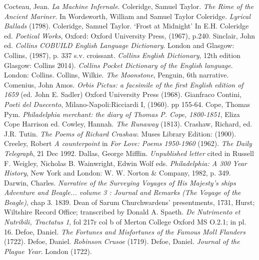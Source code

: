 \begin{bibitemlist}{1}
 Cocteau, Jean. \textit{La Machine Infernale}.
 Coleridge, Samuel Taylor. \textit{The Rime of the Ancient Mariner}. In Wordsworth, William and Samuel Taylor Coleridge. \textit{Lyrical Ballads} (1798).
 Coleridge, Samuel Taylor. ‘Frost at Midnight’ In E.H. Coleridge ed. \textit{Poetical Works}, Oxford: Oxford University Press, (1967), p.240.
 Sinclair, John ed. \textit{Collins COBUILD English Language Dictionary}. London and Glasgow: Collins, (1987), p. 337 s.v. croissant.
 \textit{Collins English Dictionary}, 12th edition Glasgow: Collins 2014).
 \textit{Collins Pocket Dictionary of the English language}. London: Collins.
 Collins, Wilkie. \textit{The Moonstone}, Penguin, 6th narrative.
 Comenius, John Amos. \textit{Orbis Pictus: a facsimile of the first English edition of 1659} (ed. John E. Sadler) Oxford University Press (1968).
 Gianfraco Contini, \textit{Poeti del Duecento}, Milano-Napoli:Ricciardi I, (1960). pp 155-64.
 Cope, Thomas Pym. \textit{Philadelphia merchant: the diary of Thomas P. Cope, 1800-1851}, Eliza Cope Harrison ed.
 Cowley, Hannah. \textit{The Runaway} (1813).
 Crashaw, Richard, ed. J.R. Tutin. \textit{The Poems of Richard Crashaw}. Muses Library Edition: (1900).
 Creeley, Robert \textit{A counterpoint} in \textit{For Love: Poems 1950-1960} (1962).
 \textit{The Daily Telegraph}, 21 Dec 1992.
 Dallas, George Mifflin. \textit{Unpublished letter} cited in Russell F. Weigley, Nicholas B. Wainwright, Edwin Wolf eds. \textit{Philadelphia: A 300 Year History}, New York and London: W. W. Norton \& Company, 1982, p. 349.
 Darwin, Charles. \textit{Narrative of the Surveying Voyages of His Majesty's ships Adventure and Beagle... volume 3 : Journal and Remarks (The Voyage of the Beagle)}, chap 3. 1839.
 Dean of Sarum Churchwardens' presentments, 1731, Hurst; Wiltshire Record Office; transcribed by Donald A. Spaeth.
 \textit{De Nutrimento et Nutribili, Tractatus 1}, fol 217r col b of Merton College Oxford MS O.2.1; in \cite{PARKES} pl. 16.
 Defoe, Daniel. \textit{The Fortunes and Misfortunes of the Famous Moll Flanders} (1722).
 Defoe, Daniel. \textit{Robinson Crusoe} (1719).
 Defoe, Daniel. \textit{Journal of the Plague Year}. London (1722).

\end{bibitemlist}
